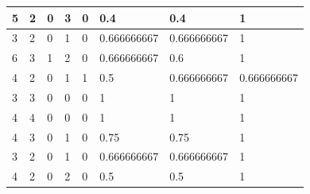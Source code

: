 \begin{small}
\begin{longtable}{|l|l|l|l|l|l|l|l|}
5  & 2                                & 0                                & 3                                & 0                                & 0.4                                    & 0.4                                     & 1                                    \\ \hline
3  & 2                                & 0                                & 1                                & 0                                & 0.666666667                            & 0.666666667                             & 1                                    \\ \hline
6  & 3                                & 1                                & 2                                & 0                                & 0.666666667                            & 0.6                                     & 1                                    \\ \hline
4  & 2                                & 0                                & 1                                & 1                                & 0.5                                    & 0.666666667                             & 0.666666667                          \\ \hline
3  & 3                                & 0                                & 0                                & 0                                & 1                                      & 1                                       & 1                                    \\ \hline
4  & 4                                & 0                                & 0                                & 0                                & 1                                      & 1                                       & 1                                    \\ \hline
4  & 3                                & 0                                & 1                                & 0                                & 0.75                                   & 0.75                                    & 1                                    \\ \hline
3  & 2                                & 0                                & 1                                & 0                                & 0.666666667                            & 0.666666667                             & 1                                    \\ \hline
4  & 2                                & 0                                & 2                                & 0                                & 0.5                                    & 0.5                                     & 1                                    \\ \hline

\end{longtable}
\end{small}
